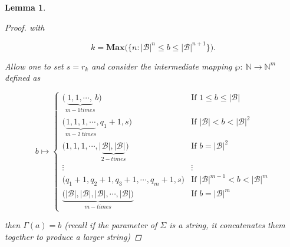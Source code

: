 \documentclass[amsmath,12pt,a4paper]{amsart}
\newtheorem{lemma}{Lemma}
\begin{document}
\begin{lemma}
\begin{proof}
with 

\begin{equation}\label{Eq37}
k = \textbf{Max}\biggl(\biggl\{n: |\mathcal{B}|^n\le b\le |\mathcal{B}|^{n+1}\}\biggr).
\end{equation}

Allow one to set $s=r_k$ and consider the intermediate mapping $\wp:~ \mathbb{N}\rightarrow \mathbb{N}^m$ defined as


\begin{equation}\label{Eq38}
b\mapsto 
\begin{cases}
\biggl(\underbrace{1,1,\cdots, }_{m-1 times} b\biggr)& \text{If $1\le b\le |\mathcal{B}|$}\\
\biggl(\underbrace{1,1,1,\cdots }_{m-2~times}, q_1+1, s\biggr) & \text{If $|\mathcal{B}|< b< |\mathcal{B}|^2$}\\
\biggl(1,1,1,\cdots, |\underbrace{\mathcal{B}|, |\mathcal{B}|}_{2-times}\biggr) & \text{If $b= |\mathcal{B}|^2$}\\
\vdots & \vdots\\
\biggl(q_1+1,q_2+1,q_3+1,\cdots, q_m+1, s\biggr) & \text{If $|\mathcal{B}|^{m-1}<b< |\mathcal{B}|^m$}\\
\underbrace{\biggl(|\mathcal{B}|, |\mathcal{B}|, |\mathcal{B}|, \cdots, |\mathcal{B}|\biggr)}_{m-times} & \text{If $b=|\mathcal{B}|^m$}
\end{cases}
\end{equation}

then $\Gamma(a) = b$ (recall if the parameter of $\Sigma$ is a string, it concatenates them together to produce a larger string)
\end{proof}
\end{lemma}
\end{document}
